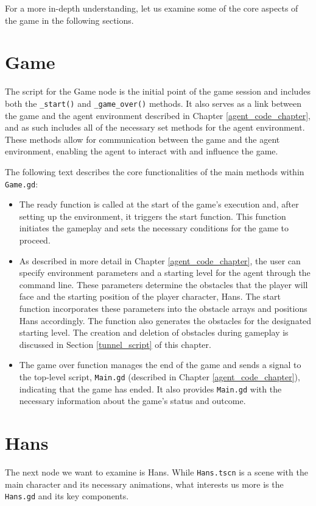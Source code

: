 For a more in-depth understanding, let us examine some of the core aspects of the game in the following sections.

\section{Game}
The script for the Game node is the initial point of the game session and includes both the \texttt{\_start()} and \texttt{\_game\_over()} methods. It also serves as a link between the game and the agent environment described in Chapter \ref{agent_code_chapter}, and as such includes all of the necessary set methods for the agent environment. These methods allow for communication between the game and the agent environment, enabling the agent to interact with and influence the game.

The following text describes the core functionalities of the main methods within \texttt{Game.gd}:
\begin{itemize}
\item The ready function is called at the start of the game's execution and, after setting up the environment, it triggers the start function. This function initiates the gameplay and sets the necessary conditions for the game to proceed.
\item As described in more detail in Chapter \ref{agent_code_chapter}, the user can specify environment parameters and a starting level for the agent through the command line. These parameters determine the obstacles that the player will face and the starting position of the player character, Hans. The start function incorporates these parameters into the obstacle arrays and positions Hans accordingly. The function also generates the obstacles for the designated starting level. The creation and deletion of obstacles during gameplay is discussed in Section \ref{tunnel_script} of this chapter.
\item The game over function manages the end of the game and sends a signal to the top-level script, \texttt{Main.gd} (described in Chapter \ref{agent_code_chapter}), indicating that the game has ended. It also provides \texttt{Main.gd} with the necessary information about the game's status and outcome.
\end{itemize}

\section{Hans}
The next node we want to examine is Hans. While \texttt{Hans.tscn} is a scene with the main character and its necessary animations, what interests us more is the \texttt{Hans.gd} and its key components.


